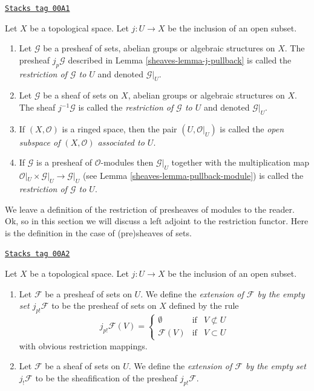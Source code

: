 \begin{definition}[Restriction]
\label{sheaves-definition-restriction}
\href{https://stacks.math.columbia.edu/tag/00A1}{\texttt{Stacks tag 00A1}}

Let $X$ be a topological space.
Let $j : U \to X$ be the inclusion of an open subset.
\begin{enumerate}
\item Let $\mathcal{G}$ be a presheaf of sets, abelian groups or
algebraic structures on $X$. The presheaf $j_p\mathcal{G}$ described
in Lemma \ref{sheaves-lemma-j-pullback} is called
the {\it restriction of $\mathcal{G}$ to $U$} and denoted $\mathcal{G}|_U$.
\item Let $\mathcal{G}$ be a sheaf of sets on $X$, abelian groups or
algebraic structures on $X$. The sheaf $j^{-1}\mathcal{G}$ is called
the {\it restriction of $\mathcal{G}$ to $U$} and denoted $\mathcal{G}|_U$.
\item If $(X, \mathcal{O})$ is a ringed space, then the pair
$(U, \mathcal{O}|_U)$ is called the
{\it open subspace of $(X, \mathcal{O})$ associated to $U$}.
\item If $\mathcal{G}$ is a presheaf of $\mathcal{O}$-modules
then $\mathcal{G}|_U$ together with the multiplication map
$\mathcal{O}|_U \times \mathcal{G}|_U \to \mathcal{G}|_U$
(see Lemma \ref{sheaves-lemma-pullback-module})
is called the {\it restriction of $\mathcal{G}$ to $U$}.
\end{enumerate}
\end{definition}

We leave a definition of the restriction of presheaves
of modules to the reader. Ok, so in this section we will
discuss a left adjoint to the restriction functor.
Here is the definition in the case of (pre)sheaves
of sets.

\begin{definition}[J shriek]
\label{sheaves-definition-j-shriek}
\href{https://stacks.math.columbia.edu/tag/00A2}{\texttt{Stacks tag 00A2}}

Let $X$ be a topological space.
Let $j : U \to X$ be the inclusion of an open subset.
\begin{enumerate}
\item Let $\mathcal{F}$ be a presheaf of sets on $U$. We define
the {\it extension of $\mathcal{F}$ by the empty set $j_{p!}\mathcal{F}$}
to be the presheaf of sets on $X$ defined by the rule
$$
j_{p!}\mathcal{F}(V) =
\left\{
\begin{matrix}
\emptyset & \text{if} & V \not \subset U \\
\mathcal{F}(V) & \text{if} & V \subset U
\end{matrix}
\right.
$$
with obvious restriction mappings.
\item Let $\mathcal{F}$ be a sheaf of sets on $U$. We define
the {\it extension of $\mathcal{F}$ by the empty set $j_!\mathcal{F}$}
to be the sheafification of the presheaf $j_{p!}\mathcal{F}$.
\end{enumerate}
\end{definition}

